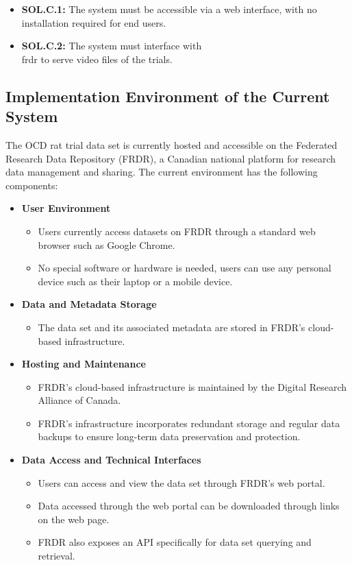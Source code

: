 \documentclass[12pt]{article}
\begin{document}
\begin{itemize}
    \item \textbf{SOL.C.1:} The system must be accessible via a web interface, with no installation required for end users.
    \item \textbf{SOL.C.2:} The system must interface with \\ \gls{frdr} to serve video files of the trials.
\end{itemize}

\subsection{Implementation Environment of the Current System}

\par{The OCD rat trial data set is currently hosted and accessible on the Federated Research Data Repository (FRDR), 
a Canadian national platform for research data management and sharing. The current environment has the following components:}

\begin{itemize}
    \item \textbf{User Environment}
    \begin{itemize}
        \item Users currently access datasets on FRDR through a standard web browser such as Google Chrome.
        \item No special software or hardware is needed, users can use any personal device such as their laptop or a mobile device.
    \end{itemize}
    \item \textbf{Data and Metadata Storage}
    \begin{itemize}
        \item The data set and its associated metadata are stored in FRDR's cloud-based infrastructure.
    \end{itemize}
    \item \textbf{Hosting and Maintenance}
    \begin{itemize}
        \item FRDR's cloud-based infrastructure is maintained by the Digital Research Alliance of Canada.
        \item FRDR's infrastructure incorporates redundant storage and regular data backups to ensure long-term data preservation and protection.
    \end{itemize}
    \item \textbf{Data Access and Technical Interfaces}
    \begin{itemize}
        \item Users can access and view the data set through FRDR's web portal.
        \item Data accessed through the web portal can be downloaded through links on the web page.
        \item FRDR also exposes an API specifically for data set querying and retrieval.
    \end{itemize}
\end{itemize}
\end{document}
